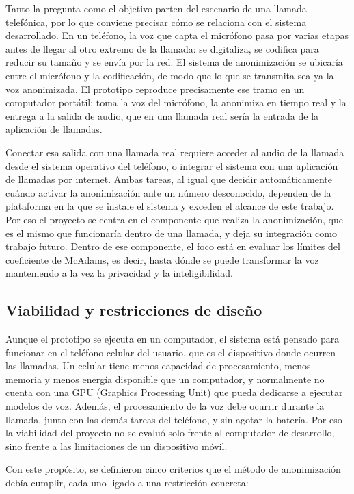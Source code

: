 \documentclass[10pt,twocolumn]{article}
\begin{document}
Tanto la pregunta como el objetivo parten del escenario de una llamada telefónica, por lo que conviene precisar cómo se relaciona con el sistema desarrollado. En un teléfono, la voz que capta el micrófono pasa por varias etapas antes de llegar al otro extremo de la llamada: se digitaliza, se codifica para reducir su tamaño y se envía por la red. El sistema de anonimización se ubicaría entre el micrófono y la codificación, de modo que lo que se transmita sea ya la voz anonimizada. El prototipo reproduce precisamente ese tramo en un computador portátil: toma la voz del micrófono, la anonimiza en tiempo real y la entrega a la salida de audio, que en una llamada real sería la entrada de la aplicación de llamadas.

Conectar esa salida con una llamada real requiere acceder al audio de la llamada desde el sistema operativo del teléfono, o integrar el sistema con una aplicación de llamadas por internet. Ambas tareas, al igual que decidir automáticamente cuándo activar la anonimización ante un número desconocido, dependen de la plataforma en la que se instale el sistema y exceden el alcance de este trabajo. Por eso el proyecto se centra en el componente que realiza la anonimización, que es el mismo que funcionaría dentro de una llamada, y deja su integración como trabajo futuro. Dentro de ese componente, el foco está en evaluar los límites del coeficiente de McAdams, es decir, hasta dónde se puede transformar la voz manteniendo a la vez la privacidad y la inteligibilidad.

\subsection{Viabilidad y restricciones de diseño}\label{sec:3.2}

Aunque el prototipo se ejecuta en un computador, el sistema está pensado para funcionar en el teléfono celular del usuario, que es el dispositivo donde ocurren las llamadas. Un celular tiene menos capacidad de procesamiento, menos memoria y menos energía disponible que un computador, y normalmente no cuenta con una GPU (Graphics Processing Unit) que pueda dedicarse a ejecutar modelos de voz. Además, el procesamiento de la voz debe ocurrir durante la llamada, junto con las demás tareas del teléfono, y sin agotar la batería. Por eso la viabilidad del proyecto no se evaluó solo frente al computador de desarrollo, sino frente a las limitaciones de un dispositivo móvil.

Con este propósito, se definieron cinco criterios que el método de anonimización debía cumplir, cada uno ligado a una restricción concreta:
\end{document}
